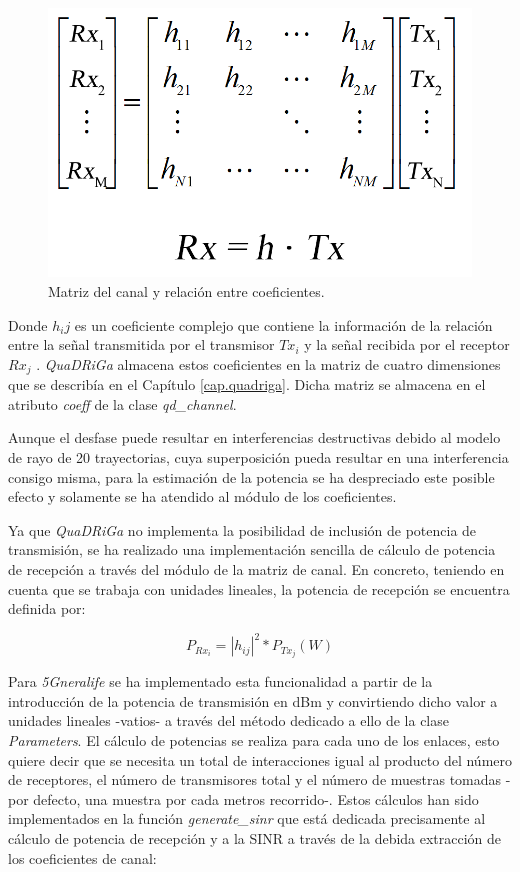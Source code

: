 \begin{figure}[h!]
	\centering
    \includegraphics[width=0.75\linewidth]{imagenes/matriz_canal.png}
	\caption{Matriz del canal y relación entre coeficientes.}
	\label{fig:matrizcanal}
\end{figure}


Donde $h_ij$ es un coeficiente complejo que contiene la información de la relación entre la señal transmitida por el transmisor $Tx_i$ y la señal recibida por el receptor $Rx_j$ \cite{matrizcanal}. \textit{QuaDRiGa} almacena estos coeficientes en la matriz de cuatro dimensiones que se describía en el Capítulo \ref{cap.quadriga}. Dicha matriz se almacena en el atributo \textit{coeff} de la clase \textit{qd\_channel}.

Aunque el desfase puede resultar en interferencias destructivas debido al modelo de rayo de 20 trayectorias, cuya superposición pueda resultar en una interferencia consigo misma, para la estimación de la potencia se ha despreciado este posible efecto y solamente se ha atendido al módulo de los coeficientes.

Ya que \textit{QuaDRiGa} no implementa la posibilidad de inclusión de potencia de transmisión, se ha realizado una implementación sencilla de cálculo de potencia de recepción a través del módulo de la matriz de canal. En concreto, teniendo en cuenta que se trabaja con unidades lineales, la potencia de recepción se encuentra definida por:

$$ P_{Rx_i} = |h_{ij}|^2 * P_{Tx_j} (W) $$

Para \textit{5Gneralife} se ha implementado esta funcionalidad a partir de la introducción de la potencia de transmisión en dBm y convirtiendo dicho valor a unidades lineales -vatios- a través del método dedicado a ello de la clase \textit{Parameters}. El cálculo de potencias se realiza para cada uno de los enlaces, esto quiere decir que se necesita un total de interacciones igual al producto del número de receptores, el número de transmisores total y el número de muestras tomadas -por defecto, una muestra por cada metros recorrido-. Estos cálculos han sido implementados en la función \textit{generate\_sinr} que está dedicada precisamente al cálculo de potencia de recepción y a la SINR a través de la debida extracción de los coeficientes de canal:

